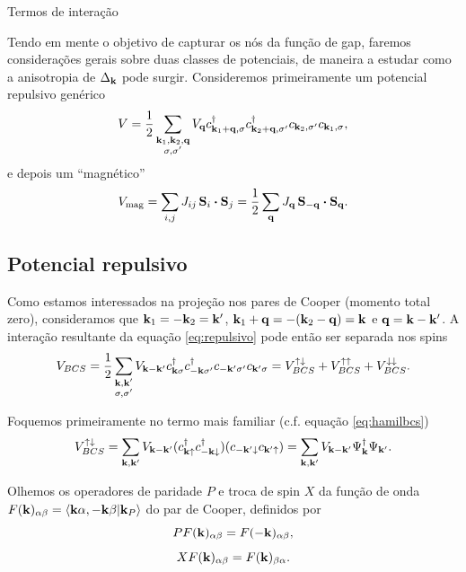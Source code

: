 \documentclass[a4paper,10pt]{article}
\begin{document}
\begin{section}{Termos de interação}

Tendo em mente o objetivo de capturar os nós da função de gap, faremos considerações gerais sobre duas classes de potenciais, de maneira a estudar como a anisotropia de $\Delta_{\vb{k}}$ pode surgir. Consideremos primeiramente um potencial repulsivo genérico
\begin{equation} \label{eq:repulsivo}
V = \frac{1}{2} \sum_{\substack{\vb{k}_1,\vb{k}_2,\vb{q} \\ \sigma, \sigma'}} V_{\vb{q}} c_{\vb{k}_1+\vb{q},\sigma}^\dagger c_{\vb{k}_2+\vb{q},\sigma'}^\dagger c_{\vb{k}_2,\sigma'} c_{\vb{k}_1,\sigma},
\end{equation}
e depois um ``magnético''
\begin{equation} \label{eq:magnetico}
V_{\text{mag}} = \sum_{i,j} J_{ij} \, \vb{S}_i \vdot \vb{S}_j = \frac{1}{2} \sum_{\q} J_{\q} \, \vb{S}_{-\q} \vdot \vb{S}_{\q}.
\end{equation}

\subsection{Potencial repulsivo}

Como estamos interessados na projeção nos pares de Cooper (momento total zero), consideramos que $\vb{k}_1 = -\vb{k}_2 = \vb{k}'$, $\vb{k}_1 + \vb{q} = -(\vb{k}_2 - \vb{q}) = \vb{k}$ e $\vb{q} = \vb{k} - \vb{k}'$. A interação resultante da equação \ref{eq:repulsivo} pode então ser separada nos spins
$$
V_{BCS} = \frac{1}{2} \sum_{\substack{\vb{k},\vb{k}' \\ \sigma, \sigma'}} V_{\vb{k}-\vb{k}'} c_{\vb{k}\sigma}^\dagger c_{-\vb{k}\sigma'}^\dagger c_{-\vb{k}'\sigma'}c_{\vb{k}'\sigma} =
V_{BCS}^{\uparrow\downarrow} + V_{BCS}^{\uparrow\uparrow} + V_{BCS}^{\downarrow\downarrow}.
$$

Foquemos primeiramente no termo mais familiar (c.f. equação \ref{eq:hamilbcs})
\begin{equation} \label{eq:updown}
V_{BCS}^{\uparrow\downarrow} = \sum_{\vb{k},\vb{k}'} V_{\vb{k}-\vb{k}'} (c_{\vb{k}\uparrow}^\dagger c_{-\vb{k}\downarrow}^\dagger) (c_{-\vb{k}'\downarrow} c_{\vb{k}'\uparrow}) =
\sum_{\vb{k},\vb{k}'} V_{\vb{k}-\vb{k}'} \Psi_{\vb{k}}^\dagger \Psi_{\vb{k}'}.
\end{equation}


Olhemos os operadores de paridade $P$ e troca de spin $X$ da função de onda $F(\vb{k})_{\alpha\beta} = \braket{\vb{k}\alpha,-\vb{k}\beta}{\vb{k}_P}$ do par de Cooper, definidos por
$$
P F(\vb{k})_{\alpha\beta} = F(-\vb{k})_{\alpha\beta},
$$
$$
X F(\vb{k})_{\alpha\beta} = F(\vb{k})_{\beta\alpha}.
$$


\end{section}
\end{document}
